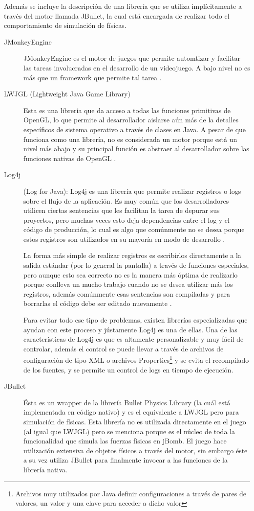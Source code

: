 \documentclass[a4paper,12pt,openany,oneside]{book}
\begin{document}
Además se incluye la descripción de una librería que se utiliza implícitamente a través del motor llamada JBullet, la cual está encargada de realizar todo el comportamiento de simulación de físicas.
\begin{description}
\item[JMonkeyEngine] JMonkeyEngine es el motor de juegos que permite automtizar y facilitar las tareas involucradas en el desarrollo de un videojuego. A bajo nivel no es más que un framework que permite tal tarea \cite{JMONKEY}.
\item[LWJGL (Lightweight Java Game Library)] Esta es una librería que da acceso a todas las funciones primitivas de OpenGL, lo que permite al desarrollador aislarse aún más de la detalles específicos de sistema operativo a través de clases en Java. A pesar de que funciona como una librería, no es considerada un motor porque está un nivel más abajo y su principal función es abstraer al desarrollador sobre las funciones nativas de OpenGL \cite{LWJGL}.
\item[Log4j](Log for Java): Log4j es una librería que permite realizar registros o logs sobre el flujo de la aplicación. Es muy común que los desarrolladores utilicen ciertas sentencias que les facilitan la tarea de depurar sus proyectos, pero muchas veces esto deja dependencias entre el log y el código de producción, lo cual es algo que comúnmente no se desea porque estos registros son utilizados en su mayoría en modo de desarrollo \cite{LOG}.

La forma más simple de realizar registros es escribirlos directamente a la salida estándar (por lo general la pantalla) a través de funciones especiales, pero aunque esto sea correcto no es la manera más óptima de realizarlo porque conlleva un mucho trabajo cuando no se desea utilizar más los registros, además comúnmente esas sentencias son compiladas y para borrarlas el código debe ser editado nuevamente \cite{LOG}.

Para evitar todo ese tipo de problemas, existen librerías especializadas que ayudan con este proceso y jústamente Log4j es una de ellas.
Una de las características de Log4j es que es altamente personalizable y muy fácil de controlar, además el control se puede llevar a través de archivos de configuración de tipo XML o archivos Properties\footnote{Archivos muy utilizados por Java definir configuraciones a través de pares de valores, un valor y una clave para acceder a dicho valor} y se evita el recompilado de los fuentes, y se permite un control de logs en tiempo de ejecución.
\item[JBullet] Ésta es un wrapper de la librería Bullet Physics Library (la cuál está implementada en código nativo) y es el equivalente a LWJGL pero para simulación de físicas. Esta librería no es utilizada directamente en el juego (al igual que LWJGL) pero se menciona porque es el núcleo de toda la funcionalidad que simula las fuerzas físicas en jBomb. El juego hace utilización extensiva de objetos físicos a través del motor, sin embargo éste a su vez utiliza JBullet para finalmente invocar a las funciones de la librería nativa.
\end{description}
\end{document}
